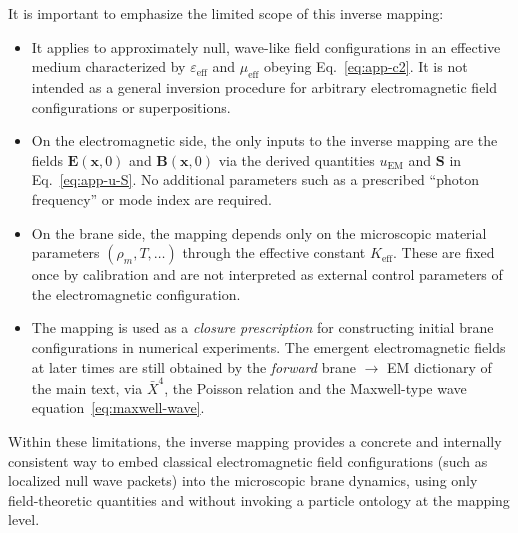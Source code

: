 It is important to emphasize the limited scope of this inverse mapping:

\begin{itemize}
  \item It applies to approximately null, wave-like field configurations
    in an effective medium characterized by
    $\varepsilon_{\mathrm{eff}}$ and $\mu_{\mathrm{eff}}$ obeying
    Eq.~\eqref{eq:app-c2}. It is not intended as a general inversion
    procedure for arbitrary electromagnetic field configurations or
    superpositions.

  \item On the electromagnetic side, the only inputs to the inverse
    mapping are the fields $\mathbf E(\mathbf x,0)$ and
    $\mathbf B(\mathbf x,0)$ via the derived quantities
    $u_{\mathrm{EM}}$ and $\mathbf S$ in Eq.~\eqref{eq:app-u-S}. No
    additional parameters such as a prescribed ``photon frequency'' or
    mode index are required.

  \item On the brane side, the mapping depends only on the microscopic
    material parameters $(\rho_m,T,\dots)$ through the effective constant
    $K_{\mathrm{eff}}$. These are fixed once by calibration and are not
    interpreted as external control parameters of the electromagnetic
    configuration.

  \item The mapping is used as a \emph{closure prescription} for
    constructing initial brane configurations in numerical experiments.
    The emergent electromagnetic fields at later times are still
    obtained by the \emph{forward} brane $\to$ EM dictionary of the main
    text, via $\bar X^4$, the Poisson relation and the Maxwell-type wave
    equation~\eqref{eq:maxwell-wave}.
\end{itemize}

Within these limitations, the inverse mapping provides a concrete and
internally consistent way to embed classical electromagnetic field
configurations (such as localized null wave packets) into the
microscopic brane dynamics, using only field-theoretic quantities and
without invoking a particle ontology at the mapping level.